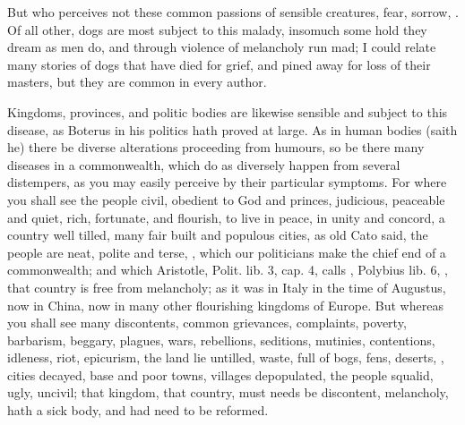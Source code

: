 But who perceives not these common passions of sensible creatures,
fear, sorrow, \etc{}. Of all other, dogs are most subject to this malady,
insomuch some hold they dream as men do, and through violence of
melancholy run mad; I could relate many stories of dogs that have died
for grief, and pined away for loss of their masters, but they are
common in every author.

Kingdoms, provinces, and politic bodies are likewise sensible and
subject to this disease, as Boterus in his politics hath proved at
large. As in human bodies (saith he) there be diverse alterations
proceeding from humours, so be there many diseases in a commonwealth,
which do as diversely happen from several distempers, as you may easily
perceive by their particular symptoms. For where you shall see the
people civil, obedient to God and princes, judicious, peaceable and
quiet, rich, fortunate, and flourish, to live in peace, in unity
and concord, a country well tilled, many fair built and populous
cities,  as old Cato said, the people are neat,
polite and terse, , which our politicians make
the chief end of a commonwealth; and which  Aristotle, Polit. lib.
3, cap. 4, calls , Polybius lib. 6, , that country is free from melancholy; as it was in Italy in the
time of Augustus, now in China, now in many other flourishing kingdoms
of Europe. But whereas you shall see many discontents, common
grievances, complaints, poverty, barbarism, beggary, plagues, wars,
rebellions, seditions, mutinies, contentions, idleness, riot,
epicurism, the land lie untilled, waste, full of bogs, fens, deserts,
\etc{}, cities decayed, base and poor towns, villages depopulated, the
people squalid, ugly, uncivil; that kingdom, that country, must needs
be discontent, melancholy, hath a sick body, and had need to be
reformed.

